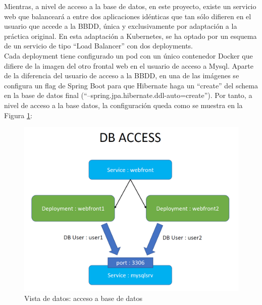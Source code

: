 \documentclass[12pt,spanish]{article}
\begin{document}
Mientras, a nivel de acceso a la base de datos, en este proyecto, existe un servicio web que balanceará a entre dos aplicaciones idénticas que tan sólo difieren en el usuario que accede a la BBDD, única y exclusivamente por adaptación a la práctica original. En esta adaptación a Kubernetes, se ha optado por un esquema de un servicio de tipo ``Load Balancer'' con dos deployments.\\
Cada deployment tiene configurado un pod con un único contenedor Docker que difiere de la imagen del otro frontal web en el usuario de acceso a Mysql. Aparte de la diferencia del usuario de acceso a la BBDD, en una de las imágenes se configura un flag de Spring Boot para que Hibernate haga un ``create'' del schema en la base de datos final (``--spring.jpa.hibernate.ddl-auto=create''). Por tanto, a nivel de acceso a la base datos, la configuración queda como se muestra en la Figura \ref{fig:dbAccess00}:
\begin{center}
 \begin{figure}[H]
 \begin{center}
   \includegraphics[width=18cm]{img/dbAccess00.png}
   \caption{Vista de datos: acceso a base de datos}
   \label{fig:dbAccess00}
 \end{center}
 \end{figure}
\end{center}
\end{document}
